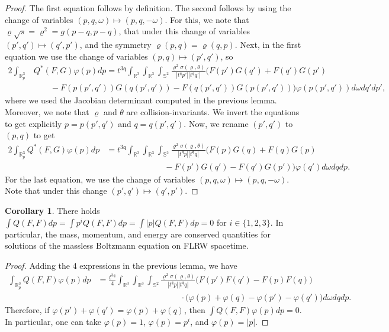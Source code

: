 \documentclass[reqno]{amsart}
\def\R{\mathbb R}
\newcommand{\qq}{\mathfrak{q}}
\theoremstyle{definition}
\newtheorem{corollary}[theorem]{Corollary}
\numberwithin{equation}{section}
\numberwithin{theorem}{section}
\begin{document}
\begin{proof}
The first equation follows by definition. The second follows by using the change of variables \((p,q,\omega)\mapsto (p,q,-\omega)\). For this, we note that \(\varrho\sqrt{s}=\varrho^2=g(p-q,p-q)\), that under this change of variables \((p',q')\mapsto (q',p')\), and the symmetry \(\varrho(p,q)=\varrho(q,p)\). Next, in the first equation we use the change of variables \((p,q)\mapsto (p',q')\), so
\begin{align*}
2\int_{\R^3_p} &Q^*(F,G)\varphi (p)dp=t^{3\qq}\int_{\mathbb{R}^3}\int_{\mathbb{R}^3}\int_{\mathbb{S}^2} \frac{\varrho^2 \sigma(\varrho,\theta)}{|t^{\mathfrak{q}}p'||t^{\mathfrak{q}}q'|}
\Big(F(p')G(q')+F(q')G(p')\\
&\qquad
-F(p(p',q'))G(q(p',q'))-F(q(p',q'))G(p(p',q'))\Big)\varphi(p(p',q'))d\omega dq'dp',
\end{align*}
where we used the Jacobian determinant computed in the previous lemma. Moreover, we note that \(\varrho\) and \(\theta\) are collision-invariants. We invert the equations to get explicitly \(p=p(p',q')\) and \(q=q(p',q')\). Now, we rename \((p',q')\) to \((p,q)\) to get 
\begin{align*}
2\int_{\R^3_p} Q^*(F,G)\varphi (p)dp&=t^{3\qq}\int_{\mathbb{R}^3}\int_{\mathbb{R}^3}\int_{\mathbb{S}^2} \frac{\varrho^2 \sigma(\varrho,\theta)}{|t^{\mathfrak{q}}p||t^{\mathfrak{q}}q|}
\Big(F(p)G(q)+F(q)G(p)\\
&\qquad\qquad\qquad\quad
-F(p')G(q')-F(q')G(p')\Big)\varphi(q')d\omega dqdp.
\end{align*}
For the last equation, we use the change of variables \((p,q,\omega)\mapsto(p,q,-\omega)\). Note that under this change \((p',q')\mapsto (q',p')\).
\end{proof}


\begin{corollary}\label{corconservationlaws}
There holds \(\int Q(F,F)dp=\int p^iQ(F,F)dp=\int |p|Q(F,F)dp=0\) for \(i\in \{1,2,3\}\). In particular, the mass, momentum, and energy are conserved quantities for solutions of the massless Boltzmann equation on FLRW spacetime.
\end{corollary} 

\begin{proof}
Adding the 4 expressions in the previous lemma, we have 
\begin{align*}
\int_{\R^3_p} Q(F,F)\varphi (p)dp&=\frac{t^{3\qq}}{4}\int_{\mathbb{R}^3}\int_{\mathbb{R}^3}\int_{\mathbb{S}^2} \frac{\varrho^2 \sigma(\varrho,\theta)}{|t^{\mathfrak{q}}p||t^{\mathfrak{q}}q|}
\Big(F(p')F(q')-F(p)F(q)\Big)\\
&\qquad \qquad\qquad \qquad \qquad \cdot \big(\varphi(p)+\varphi(q)-\varphi(p')-\varphi(q')\big)d\omega dqdp.
\end{align*}
Therefore, if \(\varphi(p')+\varphi(q')=\varphi(p)+\varphi(q)\), then \(\int  Q(F,F)\varphi (p)dp=0.\) In particular, one can take \(\varphi(p)=1\), \(\varphi(p)=p^i\), and \(\varphi(p)=|p|\).
\end{proof}
\end{document}
